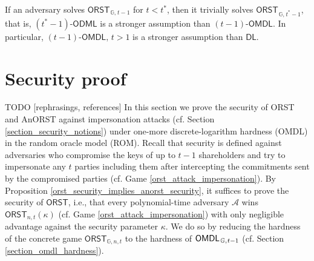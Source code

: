 \documentclass[psamsfonts, reqno]{amsart}
\theoremstyle{definition}
\theoremstyle{remark}
\numberwithin{equation}{section}
\begin{document}
If an adversary solves
$\mathsf{ORST}_{\hspace{1pt}\mathbb{G},\hspace{1pt} t-1}$
for $t < t^*$,
then it trivially solves
$\mathsf{ORST}_{\hspace{1pt}\mathbb{G},\hspace{1pt} t^*-1}$,
that is, $(t^*-1)$-$\mathsf{ODML}$ is
a stronger assumption than $(t-1)$-$\mathsf{OMDL}$.
In particular,
$(t-1)$-$\mathsf{OMDL},\hspace{2pt} t > 1$
is a stronger assumption than
$\mathsf{DL}$.

\section{Security proof}\label{section_security_proof}

\noindent
TODO [rephrasings, references]
In this section we prove the security of
\textsf{ORST} and \textsf{AnORST} against
impersonation attacks (cf. Section \ref{section_security_notions})
under one-more discrete-logarithm hardness (OMDL)
in the random oracle model (ROM).
Recall that security is defined against adversaries
who compromise the keys of up to $t-1$ shareholders
and try to impersonate any $t$ parties including them
after intercepting the commitments sent by
the compromised parties
(cf. Game \ref{orst_attack_impersonation}).
By Proposition \ref{orst_security_implies_anorst_security},
it suffices to prove the security of $\textsf{ORST}$,
i.e., that every polynomial-time adversary $\mathcal{A}$
wins $\mathsf{ORST}_{\hspace{0pt}n, t}(\kappa)$
(cf. Game \ref{orst_attack_impersonation})
with only negligible advantage against
the security parameter $\kappa$.
We do so by reducing the hardness of the concrete game
$\mathsf{ORST}_{\hspace{0pt}\mathbb{G}, n, t}$
to the hardness of
$\mathsf{OMDL}_{\hspace{1pt}\mathbb{G},\hspace{0.5pt}t-1}$
(cf. Section \ref{section_omdl_hardness}).
\end{document}
